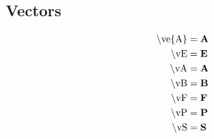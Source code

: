 \subsection{Vectors}
\begin{subequations}
\begin{align}
\textrm{\textbackslash ve\{A\}}             & = \textbf{A}              \label{eqn:ve} \\
\textrm{\textbackslash vE}                  & = \textbf{E}                 \label{eqn:vE} \\
\textrm{\textbackslash vA}                  & = \textbf{A}                 \label{eqn:vA} \\
\textrm{\textbackslash vB}                  & = \textbf{B}                 \label{eqn:vB} \\
\textrm{\textbackslash vF}                  & = \textbf{F}                 \label{eqn:vF} \\
\textrm{\textbackslash vP}                  & = \textbf{P}                 \label{eqn:vP} \\
\textrm{\textbackslash vS}                  & = \textbf{S}                 \label{eqn:vS}
\end{align}
\end{subequations}

